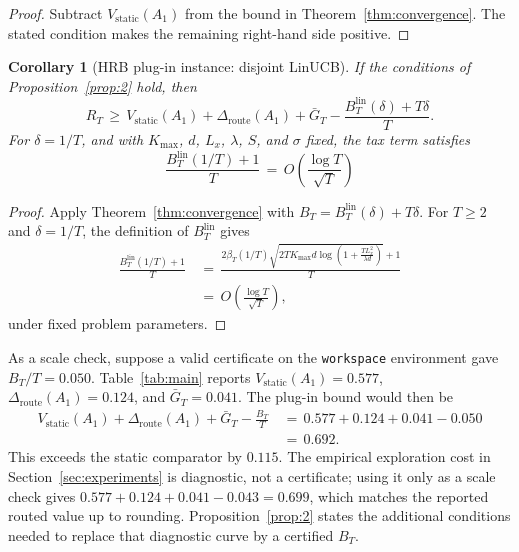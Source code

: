 \documentclass{article} %
\newtheorem{corollary}[theorem]{Corollary}
\begin{document}
\begin{proof}
Subtract \(V_{\mathrm{static}}(A_1)\) from the bound in
Theorem~\ref{thm:convergence}.  The stated condition makes the remaining
right-hand side positive.
\end{proof}

\begin{corollary}[HRB plug-in instance: disjoint LinUCB]
\label{cor:app-linucb-plugin}
If the conditions of Proposition~\ref{prop:2} hold, then
\begin{equation}
R_T
\,\geq\,
V_{\mathrm{static}}(A_1)
+
\Delta_{\mathrm{route}}(A_1)
+
\bar G_T
-
\frac{B_T^{\mathrm{lin}}(\delta)+T\delta}{T}.
\end{equation}
For \(\delta=1/T\), and with \(K_{\max}\), \(d\), \(L_x\), \(\lambda\), \(S\),
and \(\sigma\) fixed, the tax term satisfies
\begin{equation}
\frac{B_T^{\mathrm{lin}}(1/T)+1}{T}
\,=\,
O\!\left(\frac{\log T}{\sqrt T}\right)
\end{equation}
\end{corollary}

\begin{proof}
Apply Theorem~\ref{thm:convergence} with
\(B_T=B_T^{\mathrm{lin}}(\delta)+T\delta\).  For \(T\geq2\) and
\(\delta=1/T\), the definition of \(B_T^{\mathrm{lin}}\) gives
\begin{equation}
\begin{aligned}
\frac{B_T^{\mathrm{lin}}(1/T)+1}{T}
&\,=\,
\frac{
2\beta_T(1/T)
\sqrt{
2T K_{\max}d
\log\!\left(1+\frac{T L_x^2}{\lambda d}\right)
}
+1
}{T}
\\
&\,=\,
O\!\left(\frac{\log T}{\sqrt T}\right),
\end{aligned}
\end{equation}
under fixed problem parameters.
\end{proof}

As a scale check, suppose a valid certificate on the \texttt{workspace}
environment gave \(B_T/T=0.050\).  Table~\ref{tab:main} reports
\(V_{\mathrm{static}}(A_1)=0.577\),
\(\Delta_{\mathrm{route}}(A_1)=0.124\), and \(\bar G_T=0.041\).  The plug-in
bound would then be
\begin{equation}
\begin{aligned}
V_{\mathrm{static}}(A_1)
+
\Delta_{\mathrm{route}}(A_1)
+
\bar G_T
-
\frac{B_T}{T}
&\,=\,
0.577+0.124+0.041-0.050
\\
&\,=\,
0.692.
\end{aligned}
\end{equation}
This exceeds the static comparator by \(0.115\).  The empirical exploration
cost in Section~\ref{sec:experiments} is diagnostic, not a certificate; using
it only as a scale check gives
\(0.577+0.124+0.041-0.043=0.699\), which matches the reported routed value up
to rounding.  Proposition~\ref{prop:2} states the additional conditions needed
to replace that diagnostic curve by a certified \(B_T\).
\end{document}
